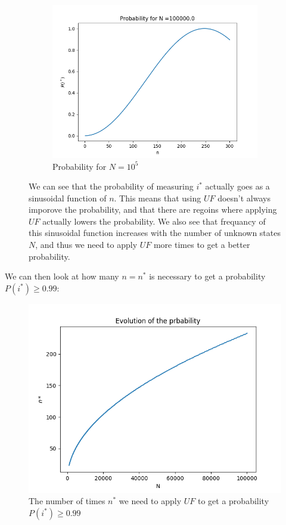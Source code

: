 \documentclass[a4paper,norsk, 10pt]{article}
\begin{document}
\begin{figure}[H]
    \begin{subfigure}[b]{0.3\textwidth}
        \includegraphics[width=\textwidth]{P1e5.png}
        \caption{Probability for $N = 10^5$}
        \label{fig:P1e5}
    \end{subfigure}
    \caption{We can see that the probability of measuring $i^*$ actually goes as a sinusoidal function of $n$. This means that using $UF$ doesn't always imporove the probability, and that there are regoins where applying $UF$ actually lowers the probability. We also see that frequancy of this sinusoidal function increases with the number of unknown states $N$, and thus we need to apply $UF$ more times to get a better probability.}\label{fig:prob}
\end{figure}


We can then look at how many $n = n^*$ is necessary to get a probability $P(i^*)\geq 0.99$:

\begin{figure}[H]
\centering
\includegraphics[scale=0.5]{pi.png}
\caption{The number of times $n^*$ we need to apply $UF$ to get a probability $P(i^*)\geq 0.99$ }
\end{figure}
\end{document}
